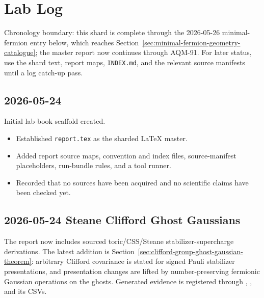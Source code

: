 
\section{Lab Log}

Chronology boundary: this shard is complete through the 2026-05-26 minimal-fermion entry below, which reaches
Section~\ref{sec:minimal-fermion-geometry-catalogue}; the master report now continues through AQM-91.  For later status, use the shard text, report maps, \texttt{INDEX.md}, and the relevant source manifests until a log catch-up pass.

\subsection*{2026-05-24}

Initial lab-book scaffold created.

\begin{itemize}
  \item Established \texttt{report.tex} as the sharded LaTeX master.
  \item Added report source maps, convention and index files, source-manifest placeholders, run-bundle rules, and a tool runner.
  \item Recorded that no sources have been acquired and no scientific claims have been checked yet.
\end{itemize}

\subsection*{2026-05-24 Steane Clifford Ghost Gaussians}

The report now includes sourced toric/CSS/Steane stabilizer-supercharge
derivations.  The latest addition is
Section~\ref{sec:clifford-group-ghost-gaussian-theorem}: arbitrary Clifford
covariance is stated for signed Pauli stabilizer presentations, and
presentation changes are lifted by number-preserving fermionic Gaussian
operations on the ghosts.  Generated evidence is registered through , , and its CSVs.

